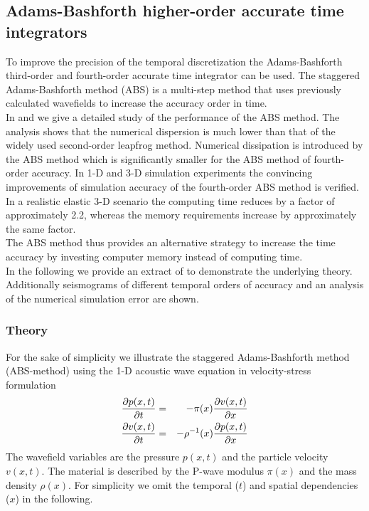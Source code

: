 \documentclass[11pt,onecolumn,oneside]{article}
\begin{document}
\subsection{Adams-Bashforth higher-order accurate time integrators}
To improve the precision of the temporal discretization the Adams-Bashforth third-order and fourth-order accurate time integrator can be used. 
The staggered Adams-Bashforth method (ABS) is a multi-step method that uses previously calculated wavefields to increase the accuracy order in time.\\
In \cite{bohlen2015higher2} and \cite{bohlen2015higher} we give a detailed study of the performance of the ABS method. The analysis shows that the numerical dispersion is much lower than that of the widely used second-order leapfrog method. Numerical dissipation is introduced by the ABS method which is significantly smaller for the ABS method of fourth-order accuracy. In 1-D and 3-D simulation experiments the convincing improvements of simulation accuracy of the fourth-order ABS method is verified. In a realistic elastic 3-D scenario the computing time reduces by a factor of approximately 2.2, whereas  the memory requirements increase by approximately the same factor. \\
The ABS method thus provides an alternative strategy to increase the time accuracy by investing computer memory instead of computing time.\\

In the following we provide an extract of \cite{bohlen2015higher2} to demonstrate the underlying theory. Additionally seismograms of different temporal orders of accuracy and an analysis of the numerical simulation error are shown.\\ 
\subsubsection{Theory}
For the sake of simplicity we illustrate the staggered Adams-Bashforth method (ABS-method) using the 1-D acoustic wave equation in velocity-stress formulation
\begin{eqnarray}
\frac{\partial p(x,t)}{\partial t}&=& - \pi (x) \frac{\partial v(x,t)}{\partial x}  \notag \\
\frac{\partial v(x,t)}{\partial t}&=& -\rho^{-1}(x) \frac{\partial p(x,t)}{\partial x}
\label{waveequation}
\end{eqnarray}
The wavefield variables are the pressure $p(x,t)$ and the particle velocity $v(x,t)$. The material is described by the P-wave modulus $\pi (x)$ and the mass density $\rho(x)$. For simplicity we omit the temporal ($t$) and spatial dependencies ($x$)  in the following.
\end{document}
